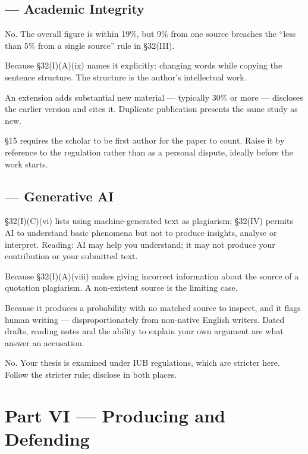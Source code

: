 \subsection*{ --- Academic Integrity}
\begin{tightnum}
  \item No. The overall figure is within 19\%, but 9\% from one source breaches
    the ``less than 5\% from a single source'' rule in \S32(III).
  \item Because \S32(I)(A)(ix) names it explicitly: changing words while copying
    the sentence structure. The structure is the author's intellectual work.
  \item An extension adds substantial new material --- typically 30\% or more
    --- discloses the earlier version and cites it. Duplicate publication
    presents the same study as new.
  \item \S15 requires the scholar to be first author for the paper to count.
    Raise it by reference to the regulation rather than as a personal dispute,
    ideally before the work starts.
\end{tightnum}

\subsection*{ --- Generative AI}
\begin{tightnum}
  \item \S32(I)(C)(vi) lists using machine-generated text as plagiarism;
    \S32(IV) permits AI to understand basic phenomena but not to produce
    insights, analyse or interpret. Reading: AI may help you understand; it may
    not produce your contribution or your submitted text.
  \item Because \S32(I)(A)(viii) makes giving incorrect information about the
    source of a quotation plagiarism. A non-existent source is the limiting case.
  \item Because it produces a probability with no matched source to inspect, and
    it flags human writing --- disproportionately from non-native English
    writers. Dated drafts, reading notes and the ability to explain your own
    argument are what answer an accusation.
  \item No. Your thesis is examined under IUB regulations, which are stricter
    here. Follow the stricter rule; disclose in both places.
\end{tightnum}

\section{Part VI --- Producing and Defending}

